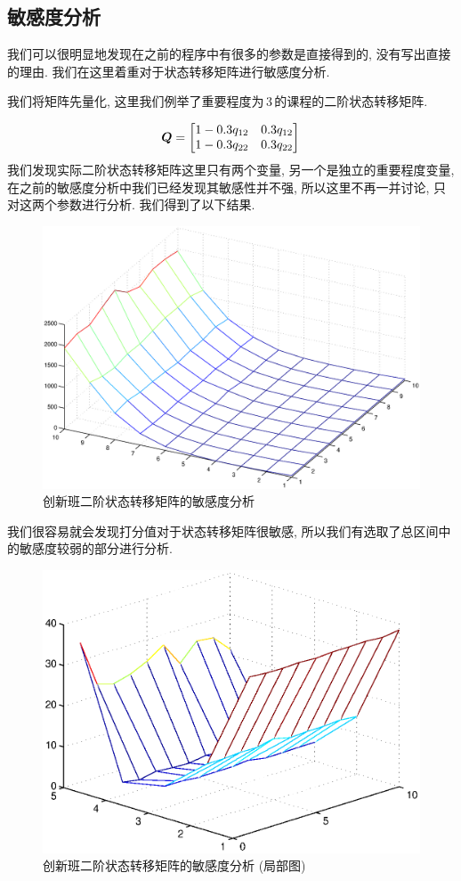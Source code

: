\documentclass[a4paper]{article}
\renewcommand{\matrix}{\matrixsym} %
\begin{document}
 \subsection{敏感度分析}
  我们可以很明显地发现在之前的程序中有很多的参数是直接得到的, 没有写出直接的理由. 我们在这里着重对于状态转移矩阵进行敏感度分析.\par
  我们将矩阵先量化, 这里我们例举了重要程度为\,3\,的课程的二阶状态转移矩阵.\par
  \begin{equation}
  \matrix{Q}=
  \begin{bmatrix}
  1-0.3q_{12} & 0.3q_{12} \\
  1-0.3q_{22} & 0.3q_{22}
  \end{bmatrix}
  \end{equation}
  我们发现实际二阶状态转移矩阵这里只有两个变量, 另一个是独立的重要程度变量, 在之前的敏感度分析中我们已经发现其敏感性并不强, 所以这里不再一并讨论, 只对这两个参数进行分析. 我们得到了以下结果.
  \begin{figure}[H]
  \centerline{\includegraphics[scale=0.5]{inno2.eps}}
  \caption{创新班二阶状态转移矩阵的敏感度分析}
  \end{figure}
  我们很容易就会发现打分值对于状态转移矩阵很敏感, 所以我们有选取了总区间中的敏感度较弱的部分进行分析.
  \begin{figure}[H]
  \centerline{\includegraphics[scale=0.7]{inno2part.eps}}
  \caption{创新班二阶状态转移矩阵的敏感度分析 (局部图)}
  \end{figure}
\end{document}
